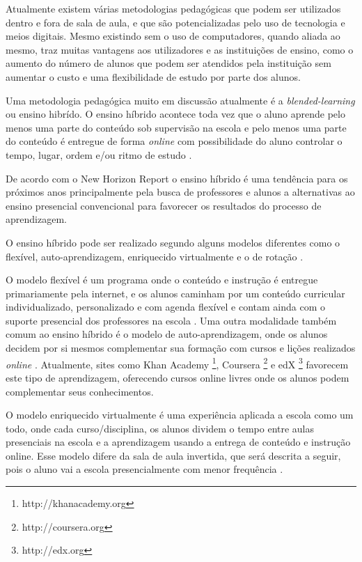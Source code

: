 Atualmente existem várias metodologias pedagógicas que podem ser utilizados dentro e fora de sala de aula, e que são potencializadas pelo uso de tecnologia e meios digitais. Mesmo existindo sem o uso de computadores, quando aliada ao mesmo, traz muitas vantagens aos utilizadores e as instituições de ensino, como o aumento do número de alunos que podem ser atendidos pela instituição sem aumentar o custo e uma flexibilidade de estudo por parte dos alunos. 

Uma metodologia pedagógica muito em discussão atualmente é a \emph{blended-learning} ou ensino hibrído. O ensino híbrido acontece toda vez que o aluno aprende pelo menos uma parte do conteúdo sob supervisão na escola e pelo menos uma parte do conteúdo é entregue de forma \emph{online} com possibilidade do aluno controlar o tempo, lugar, ordem e/ou ritmo de estudo \cite{horn_rise_2011}.

De acordo com o New Horizon Report \cite{horizon_report_he_2015} o ensino híbrido é uma tendência para os próximos anos principalmente pela busca de professores e alunos a alternativas ao ensino presencial convencional para favorecer os resultados do processo de aprendizagem.

O ensino híbrido pode ser realizado segundo alguns modelos diferentes como o flexível, auto-aprendizagem, enriquecido virtualmente e o de rotação \cite{staker_classifying_2012}.


O modelo flexível é um programa onde o conteúdo e instrução é entregue primariamente pela internet, e os alunos caminham por um conteúdo curricular individualizado, personalizado e com agenda flexível e contam ainda com o suporte presencial dos professores na escola \cite{staker_classifying_2012}. Uma outra modalidade também comum ao ensino híbrido é o modelo de auto-aprendizagem, onde os alunos decidem por si mesmos complementar sua formação com cursos e lições realizados \emph{online} \cite{horn_rise_2011}. Atualmente, sites como Khan Academy \footnote{http://khanacademy.org}, Coursera \footnote{http://coursera.org} e edX \footnote{http://edx.org} favorecem este tipo de aprendizagem, oferecendo cursos online livres onde os alunos podem complementar seus conhecimentos.

O modelo enriquecido virtualmente é uma experiência aplicada a escola como um todo, onde cada curso/disciplina, os alunos dividem o tempo entre aulas presenciais na escola e a aprendizagem usando a entrega de conteúdo e instrução online. Esse modelo difere da sala de aula invertida, que será descrita a seguir, pois o aluno vai a escola presencialmente com menor frequência \cite{staker_classifying_2012}.

